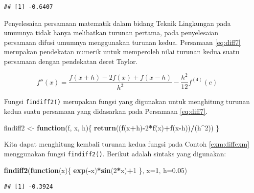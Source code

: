 \documentclass[]{book}
\newenvironment{Shaded}{\begin{snugshade}}{\end{snugshade}}
\newcommand{\ControlFlowTok}[1]{\textcolor[rgb]{0.13,0.29,0.53}{\textbf{#1}}}
\newcommand{\DataTypeTok}[1]{\textcolor[rgb]{0.13,0.29,0.53}{#1}}
\newcommand{\DecValTok}[1]{\textcolor[rgb]{0.00,0.00,0.81}{#1}}
\newcommand{\FloatTok}[1]{\textcolor[rgb]{0.00,0.00,0.81}{#1}}
\newcommand{\KeywordTok}[1]{\textcolor[rgb]{0.13,0.29,0.53}{\textbf{#1}}}
\newcommand{\NormalTok}[1]{#1}
\newcommand{\OperatorTok}[1]{\textcolor[rgb]{0.81,0.36,0.00}{\textbf{#1}}}
\newcommand{\StringTok}[1]{\textcolor[rgb]{0.31,0.60,0.02}{#1}}
\theoremstyle{definition}
\theoremstyle{definition}
\theoremstyle{definition}
\theoremstyle{remark}
\begin{document}
\begin{verbatim}
## [1] -0.6407
\end{verbatim}

Penyelesaian persamaan matematik dalam bidang Teknik Lingkungan pada umumnya tidak hanya melibatkan turunan pertama, pada penyelesaian persamaan difusi umumnya menggunakan turunan kedua. Persamaan \eqref{eq:diff7} merupakan pendekatan numerik untuk memperoleh nilai turunan kedua suatu persamaan dengan pendekatan deret Taylor.

\begin{equation}
f''\left(x\right)=\frac{f\left(x+h\right)-2f\left(x\right)+f\left(x-h\right)}{h^2}-\frac{h^2}{12}f^{\left(4\right)}\left(c\right)
  \label{eq:diff7}
\end{equation}

Fungsi \texttt{findiff2()} merupakan fungsi yang digunakan untuk menghitung turunan kedua suatu persamaan yang didasarkan pada Persamaan \eqref{eq:diff7}.

\begin{Shaded}
\begin{Highlighting}[]
\NormalTok{findiff2 <-}\StringTok{ }\ControlFlowTok{function}\NormalTok{(f, x, h)\{}
  \KeywordTok{return}\NormalTok{((}\KeywordTok{f}\NormalTok{(x}\OperatorTok{+}\NormalTok{h)}\OperatorTok{-}\DecValTok{2}\OperatorTok{*}\KeywordTok{f}\NormalTok{(x)}\OperatorTok{+}\KeywordTok{f}\NormalTok{(x}\OperatorTok{-}\NormalTok{h))}\OperatorTok{/}\NormalTok{(h}\OperatorTok{^}\DecValTok{2}\NormalTok{))}
\NormalTok{\}}
\end{Highlighting}
\end{Shaded}

Kita dapat menghitung kembali turunan kedua fungsi pada Contoh \ref{exm:diffexm} menggunakan fungsi \texttt{findiff2()}. Berikut adalah sintaks yang digunakan:

\begin{Shaded}
\begin{Highlighting}[]
\KeywordTok{findiff2}\NormalTok{(}\ControlFlowTok{function}\NormalTok{(x)\{}
  \KeywordTok{exp}\NormalTok{(}\OperatorTok{-}\NormalTok{x)}\OperatorTok{*}\KeywordTok{sin}\NormalTok{(}\DecValTok{2}\OperatorTok{*}\NormalTok{x)}\OperatorTok{+}\DecValTok{1}
\NormalTok{\}, }\DataTypeTok{x=}\DecValTok{1}\NormalTok{, }\DataTypeTok{h=}\FloatTok{0.05}\NormalTok{)}
\end{Highlighting}
\end{Shaded}

\begin{verbatim}
## [1] -0.3924
\end{verbatim}
\end{document}
